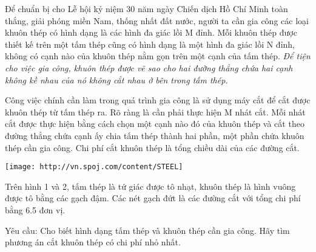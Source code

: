 Để chuẩn bị cho Lễ hội kỷ niệm 30 năm ngày Chiến dịch Hồ Chí Minh toàn thắng, giải phóng miền Nam, thống nhất đất nước, người ta cần gia   công các loại khuôn thép có hình dạng là các hình đa giác lồi M đỉnh. Mỗi khuôn thép được thiết kế trên một tấm thép cũng có hình dạng là một hình đa   giác lồi N đỉnh, không có cạnh nào của khuôn thép nằm gọn trên một cạnh của tấm thép.   \emph{    Để tiện cho việc gia công, khuôn thép được vẽ sao cho hai   đường thẳng chứa hai cạnh không kề nhau của nó không cắt nhau ở bên trong tấm thép.   }

   Công việc chính cần làm trong quá trình gia công là sử dụng máy cắt để cắt được khuôn thép từ tấm thép ra. Rõ ràng là cần phải thực hiện M nhát   cắt. Mỗi nhát cắt được thực hiện bằng cách chọn một cạnh nào đó của khuôn thép và cắt theo đường thẳng chứa cạnh ấy chia tấm thép thành hai phần,   một phần chứa khuôn thép cần gia công. Chi phí cắt khuôn thép là tổng chiều dài của các đường cắt.  


\texttt{[image: http://vn.spoj.com/content/STEEL]}

   Trên hình 1 và 2, tấm thép là tứ giác được tô nhạt, khuôn thép là hình vuông được tô bằng các gạch đậm. Các nét gạch đứt là các đường cắt với   tổng chi phí bằng 6.5 đơn vị.  

   Yêu cầu: Cho biết hình dạng tấm thép và khuôn thép cần gia công. Hãy tìm phương án cắt khuôn thép có chi phí nhỏ nhất.